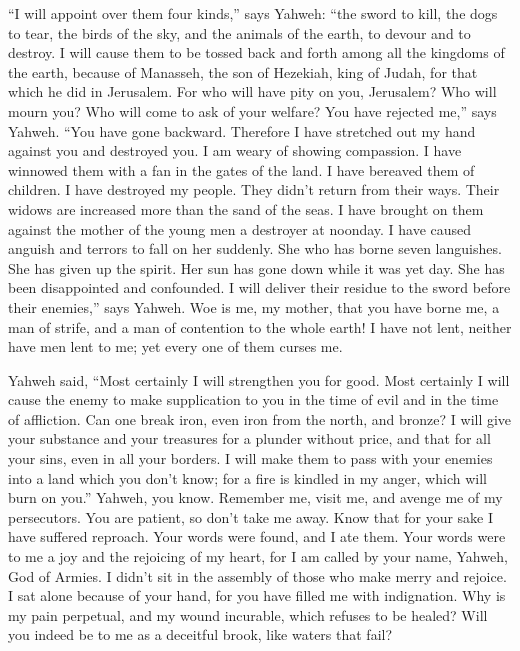  ``I will appoint over them four kinds,'' says Yahweh:
``the sword to kill, the dogs to tear, the birds of the sky, and the
animals of the earth, to devour and to destroy.  I will
cause them to be tossed back and forth among all the kingdoms of the
earth, because of Manasseh, the son of Hezekiah, king of Judah, for that
which he did in Jerusalem.  For who will have pity on you,
Jerusalem? Who will mourn you? Who will come to ask of your welfare?
 You have rejected me,'' says Yahweh. ``You have gone
backward. Therefore I have stretched out my hand against you and
destroyed you. I am weary of showing compassion.  I have
winnowed them with a fan in the gates of the land. I have bereaved them
of children. I have destroyed my people. They didn't return from their
ways.  Their widows are increased more than the sand of
the seas. I have brought on them against the mother of the young men a
destroyer at noonday. I have caused anguish and terrors to fall on her
suddenly.  She who has borne seven languishes. She has
given up the spirit. Her sun has gone down while it was yet day. She has
been disappointed and confounded. I will deliver their residue to the
sword before their enemies,'' says Yahweh.  Woe is me, my
mother, that you have borne me, a man of strife, and a man of contention
to the whole earth! I have not lent, neither have men lent to me; yet
every one of them curses me.

 Yahweh said, ``Most certainly I will strengthen you for
good. Most certainly I will cause the enemy to make supplication to you
in the time of evil and in the time of affliction.  Can
one break iron, even iron from the north, and bronze?  I
will give your substance and your treasures for a plunder without price,
and that for all your sins, even in all your borders.  I
will make them to pass with your enemies into a land which you don't
know; for a fire is kindled in my anger, which will burn on you.''
 Yahweh, you know. Remember me, visit me, and avenge me
of my persecutors. You are patient, so don't take me away. Know that for
your sake I have suffered reproach.  Your words were
found, and I ate them. Your words were to me a joy and the rejoicing of
my heart, for I am called by your name, Yahweh, God of Armies.
 I didn't sit in the assembly of those who make merry and
rejoice. I sat alone because of your hand, for you have filled me with
indignation.  Why is my pain perpetual, and my wound
incurable, which refuses to be healed? Will you indeed be to me as a
deceitful brook, like waters that fail?

